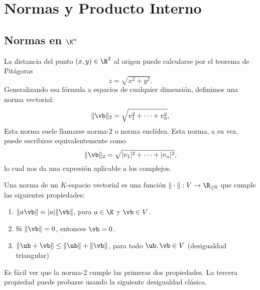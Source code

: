 \chapter{Normas y Producto Interno}
\setcounter{equation}{0}

\section{Normas en $\K^n$}

La distancia del punto $(x,y)\in \R^2$  al origen puede calcularse por el teorema de Pitágoras
$$
z = \sqrt{x^2 + y^2}.
$$
Generalizando esa fórmula a espacios de cualquier dimensión, definimos una norma vectorial:
$$
\|\vb\|_2 = \sqrt{v_1^2 + \dots + v_n^2},
$$
Esta norma suele llamarse norma-$2$ o norma euclídea. Esta norma,  a su vez, puede escribirse equivalentemente como
$$
\|\vb\|_2 = \sqrt{|v_1|^2 + \dots + |v_n|^2},
$$
lo cual nos da una expresión aplicable a los complejos.

\tccdefi
\begin{defi}
Una norma de un $K$-espacio vectorial es una función $\| \cdot \| : V \rightarrow \R_{\ge 0}$ que cumple las siguientes propiedades:
\begin{enumerate}
\item $\|a \vb\| = |a| \|\vb\|$, para $a \in \K$ y $\vb \in V$.
\item Si $\|\vb\| = 0$, entonces $\vb = 0$.
\item $\|\ub + \vb\| \le \|\ub\| + \|\vb\|$, para todo $\ub, \vb \in V$ \qquad (desigualdad triangular)
\end{enumerate}
\end{defi}
\etcc
Es fácil ver que la norma-2 cumple las primeras dos propiedades.  La tercera propiedad puede probarse usando la siguiente desigualdad clásica.

